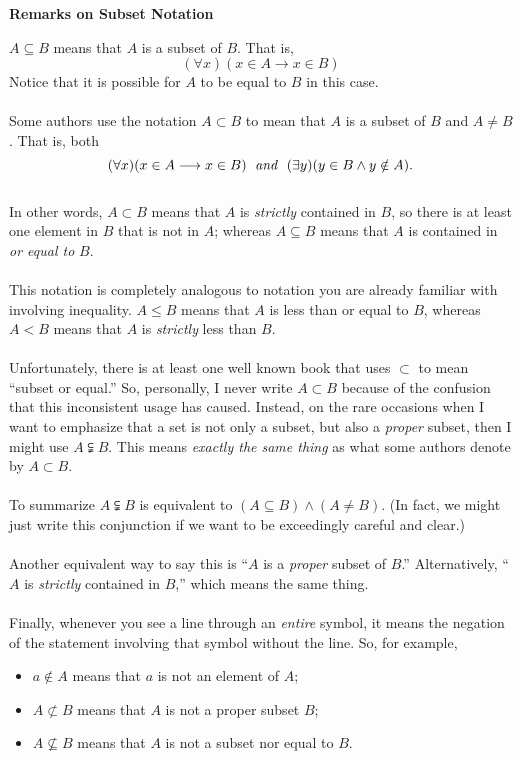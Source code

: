 \documentclass[12pt,reqno]{amsart}
\newcommand{\meet}{\ensuremath{\wedge}}
\begin{document}
\thispagestyle{empty}

\begin{center}
\textbf{Remarks on Subset Notation}
\end{center}

\noindent $A\subseteq B$ means that $A$ is a subset of $B$.  That is,
\[
(\forall x)(x\in A \longrightarrow x\in B)
\]
Notice that it is possible for $A$ to be equal to $B$ in this case.
\\\\
Some authors use the notation $A\subset B$ to mean that $A$ is a 
subset of $B$ and $A\neq B$.  That is, both
\[
(\forall x)(x\in A \longrightarrow x\in B)\; \text{ \emph{and} }\; (\exists y)
(y\in B \meet y\notin A ).
\]
\\
In other words, $A\subset B$ means that $A$ is \emph{strictly} contained in $B$,
so there is at least one element in $B$ that is not in $A$; whereas
$A\subseteq B$ means that $A$ is contained in \emph{or equal to} $B$.
\\\\
This notation is completely analogous to notation you are already familiar with
involving inequality.  $A\leq B$ means that $A$ is less than or equal to $B$,
whereas $A< B$ means that $A$ is \emph{strictly} less than $B$.
\\\\
Unfortunately, there is at least one well known book that uses $\subset$ to mean ``subset or equal.''  So, personally, I never write $A\subset B$ because of the 
confusion that this inconsistent usage has caused.
Instead, on the rare occasions when I want to emphasize that a set is not only 
a subset, but also a \emph{proper} subset, then I might use $A\subsetneqq B$.
This means \emph{exactly the same thing} as
what some authors denote by $A\subset B$.
\\\\
To summarize $A\subsetneqq B$ is equivalent to $(A\subseteq B) \wedge (A \neq B)$.
(In fact, we might just write this conjunction if we want to be exceedingly 
careful and clear.)
\\\\
Another equivalent way to say this is ``$A$ is a \emph{proper} subset of $B$.'' 
Alternatively, ``$A$ is \emph{strictly} contained in $B$,'' which means the same thing.
\\\\
Finally, whenever you see a line through an \emph{entire} symbol, it means the
negation of the statement involving that symbol without the line.  So, for example, 
\begin{itemize}
\item $a\notin A$ means that $a$ is not an element of
$A$;
\item $A\not \subset B$ means that $A$ is not a proper subset $B$;
\item $A\nsubseteq B$ means that $A$ is not a subset nor equal to $B$.
\end{itemize}
\end{document}
